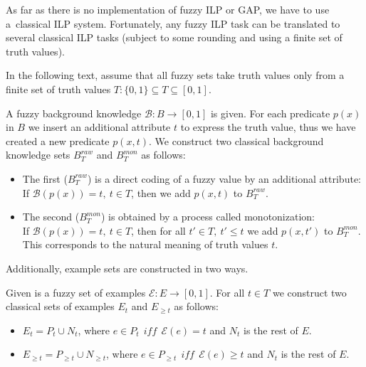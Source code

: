 As far as there is no implementation of fuzzy ILP or GAP, we have to use a~classical ILP system. Fortunately, any fuzzy ILP task can be translated to several classical ILP tasks (subject to some rounding and using a finite set of truth values).

In the following text, assume that all fuzzy sets take truth values only from a finite set of truth values $T: \{0,1\}\subseteq T\subseteq [0,1]$.

\begin{definition}
A fuzzy background knowledge ${\mathcal B}:B\longrightarrow [0,1]$ is given. For each predicate $p(x)$ in $B$ we insert an additional attribute $t$ to express the truth value, thus we have created a new predicate $p(x,t)$. We construct two classical background knowledge sets $B^{raw}_T$ and $B^{mon}_T$  as follows:

\begin{itemize}
	\item The first ($B^{raw}_T$) is a direct coding of a fuzzy value by an additional attribute:
\\If ${\mathcal B}(p(x))=t,\  t \in T$, then we add $p(x,t)$ to  ${B}^{raw}_T$.
	\item The second ($B^{mon}_T$) is obtained by a process called monotonization:
\\If ${\mathcal B}(p(x))=t,\  t \in T$, then for all $t'\in T,\  t'\le t$ we add $p(x,t')$ to ${B}^{mon}_T$.
This corresponds to the natural meaning of truth values $t$.
\end{itemize}
\end{definition}



Additionally, example sets are constructed in two ways.
\begin{definition}
Given is a fuzzy set of examples ${\mathcal E}:E\longrightarrow [0,1]$. For all $t\in T$ we construct two classical sets of examples $E_t$ and $E_{\ge t}$  as follows:
\begin{itemize}
	\item $E_t=P_t\cup N_t$, where 
$e\in P_t \ \ iff \ \ {\mathcal E}(e)= t$
and $N_t$ is the rest of $E$.
	\item $E_{\ge t}=P_{\ge t}\cup N_{\ge t}$, where 
$e\in P_{\ge t} \ \ iff \ \ {\mathcal E}(e)\ge t$
and $N_t$ is the rest of $E$.
\end{itemize}
\end{definition}



